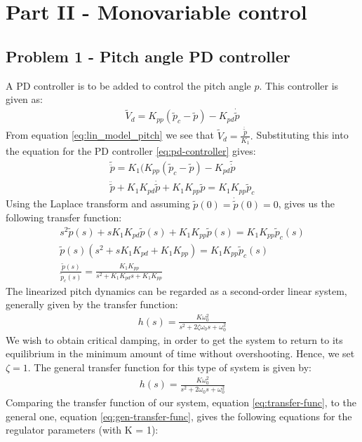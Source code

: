 \section{Part II - Monovariable control}
\subsection{Problem 1 - Pitch angle PD controller}
A PD controller is to be added to control the pitch angle $p$. This controller is given as:
\begin{gather}
    \tilde{V}_d = K_{pp}(\tilde{p}_c-\tilde{p})-K_{pd}{\dot{\tilde{p}}}\label{eq:pd-controller}
\end{gather}
From equation \eqref{eq:lin_model_pitch} we see that $\tilde{V}_d = \frac{\ddot{\tilde{p}}}{K_1}.$ Substituting this into the equation for the PD controller \eqref{eq:pd-controller} gives:
\begin{gather*}
    \tilde{\ddot{p}} = K_1(K_{pp}(\tilde{p}_c - \tilde{p}) - K_{pd}\tilde{\dot{p}} \\
    \ddot{\tilde{p}} + K_1K_{pd}\dot{\tilde{p}} + K_1K_{pp}\tilde{p} = K_1 K_{pp} \tilde{p}_c
\end{gather*}
Using the Laplace transform and assuming $\tilde{p}(0) = \dot{\tilde{p}}(0) = 0$, gives us the following transfer function:
\begin{gather}
    s^2\tilde{p}(s) + sK_1K_{pd}\tilde{p}(s) + K_1K_{pp}\tilde{p}(s) = K_1K_{pp}\tilde{p}_c(s)\nonumber \\
    \tilde{p}(s)(s^2 + sK_1K_{pd} + K_1K_{pp}) = K_1K_{pp}\tilde{p}_c(s)\nonumber \\
    \frac{\tilde{p}(s)}{\tilde{p}_c(s)} = \frac{K_1K_{pp}}{s^2 + K_1K_{pd}s + K_1K_{pp}}
    \label{eq:transfer-func}
\end{gather}
The linearized pitch dynamics can be regarded as a second-order linear system, generally given by the transfer function:
\begin{gather*}
    h(s) = \frac{K\omega_0^2}{s^2 + 2\zeta\omega_0s + \omega_0^2}
\end{gather*}
We wish to obtain critical damping, in order to get the system to return to its equilibrium in the minimum amount of time without overshooting. Hence, we set $\zeta = 1$. The general transfer function for this type of system is given by:
\begin{gather}
    h(s) = \frac{K\omega_0^2}{s^2 + 2\omega_0s + \omega_0^2}
    \label{eq:gen-transfer-func}
\end{gather}
Comparing the transfer function of our system, equation \eqref{eq:transfer-func}, to the general one, equation \eqref{eq:gen-transfer-func}, gives the following equations for the regulator parameters (with K = 1):
